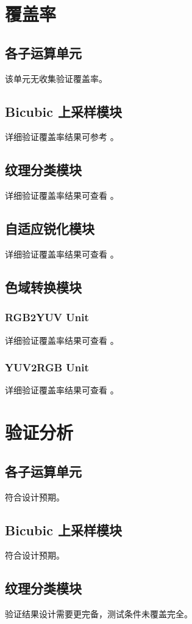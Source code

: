 \documentclass[12pt, a4paper, oneside]{ctexbook}
\begin{document}
	\section{覆盖率}
	\subsection{各子运算单元}
	该单元无收集验证覆盖率。
	\subsection{Bicubic 上采样模块}
	详细验证覆盖率结果可参考 \textbf{}。
	\subsection{纹理分类模块}
	详细验证覆盖率结果可查看 \textbf{}。
	\subsection{自适应锐化模块}
	详细验证覆盖率结果可查看 \textbf{}。
	\subsection{色域转换模块}
	\subsubsection{RGB2YUV Unit}
	详细验证覆盖率结果可查看 \textbf{}。
	\subsubsection{YUV2RGB Unit}
	详细验证覆盖率结果可查看 \textbf{}。
	
	\section{验证分析}
	\subsection{各子运算单元}
	符合设计预期。
	\subsection{Bicubic 上采样模块}
	符合设计预期。
	\subsection{纹理分类模块}
	验证结果设计需要更完备，测试条件未覆盖完全。
\end{document}
